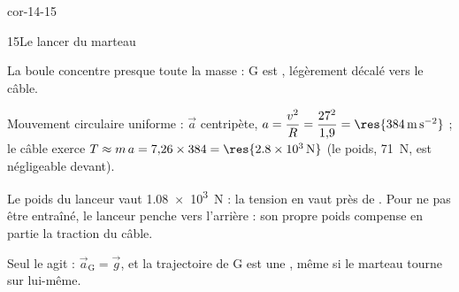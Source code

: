 \begin{blocLivre}{cor-14-15}
\begin{corrige}{15}{Le lancer du marteau}
\begin{questions}
\item La boule concentre presque toute la masse : G est , légèrement
décalé vers le câble.
\item Mouvement circulaire uniforme : $\vec{a}$ centripète, $a=\dfrac{v^2}{R}=\dfrac{27^2}{1{,}9}=\res{\qty{384}{m.s^{-2}}}$ ;
le câble exerce $T\approx m\,a=7{,}26\times384=\res{\qty{2,8e3}{N}}$ (le poids, \qty{71}{N}, est négligeable devant).
\item Le poids du lanceur vaut \qty{1,08e3}{N} : la tension en vaut près de . Pour ne pas être
entraîné, le lanceur penche vers l'arrière : son propre poids compense en partie la traction du câble.
\item Seul le  agit : $\vec{a}_\mathrm{G}=\vec{g}$, et la trajectoire de G est une
, même si le marteau tourne sur lui-même.
\end{questions}
\end{corrige}
\end{blocLivre}
